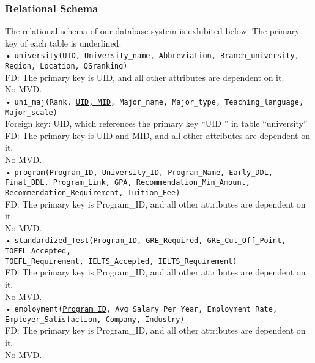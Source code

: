 \documentclass[12pt, a4paper]{article}
\begin{document}
\begin{spacing}{1.32}
\subsubsection{Relational Schema}
\noindent
The relational schema of our database system is exhibited below. The primary key of each table is underlined. \\

\noindent
• \texttt{university(\underline{UID}, University\_name, Abbreviation, Branch\_university, Region, Location, QSranking)}\\
FD: The primary key is UID, and all other attributes are dependent on it.\\
No MVD.\\

\noindent
• \texttt{uni\_maj(Rank, \underline{UID, MID}, Major\_name, Major\_type, Teaching\_language, Major\_scale)}\\
Foreign key: UID, which references the primary key “UID ” in table “university” \\
FD: The primary key is UID and MID, and all other attributes are dependent on it.\\
No MVD.\\


\noindent
• \texttt{program(\underline{Program\_ID}, University\_ID, Program\_Name, Early\_DDL, Final\_DDL, Program\_Link, GPA, Recommendation\_Min\_Amount, Recommendation\_Requirement, Tuition\_Fee)}\\
FD: The primary key is Program\_ID, and all other attributes are dependent on it.\\
No MVD.\\


\noindent
• \texttt{standardized\_Test(\underline{Program\_ID}, GRE\_Required, GRE\_Cut\_Off\_Point, TOEFL\_Accepted,\\ 
TOEFL\_Requirement, IELTS\_Accepted, IELTS\_Requirement)}\\
FD: The primary key is Program\_ID, and all other attributes are dependent on it.\\
No MVD.\\

\noindent
• \texttt{employment(\underline{Program\_ID}, Avg\_Salary\_Per\_Year, Employment\_Rate, Employer\_Satisfaction, Company, Industry)}\\
FD: The primary key is Program\_ID, and all other attributes are dependent on it.\\
No MVD.\\


\end{spacing}
\end{document}
